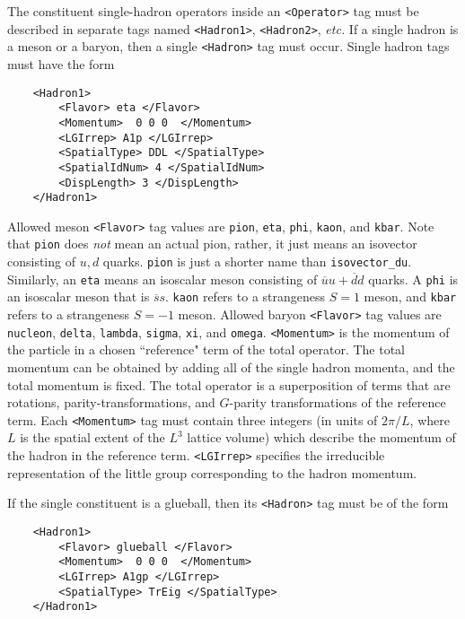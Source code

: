 \documentclass[12pt,notitlepage,letterpaper]{article}
\newcommand{\vb}{\texttt}
\begin{document}
The constituent single-hadron operators inside an \vb{<Operator>} tag
must be described in   
separate tags named \vb{<Hadron1>}, \vb{<Hadron2>}, \textit{etc.}  If a single hadron 
is a meson or a baryon, then a single \vb{<Hadron>} tag must occur.
Single hadron tags must have the form    
\begin{verbatim}                
    <Hadron1>                                               
        <Flavor> eta </Flavor>                               
        <Momentum>  0 0 0  </Momentum>                       
        <LGIrrep> A1p </LGIrrep>                             
        <SpatialType> DDL </SpatialType>                     
        <SpatialIdNum> 4 </SpatialIdNum>                     
        <DispLength> 3 </DispLength>                         
    </Hadron1>                                              
\end{verbatim}                                              
Allowed meson \vb{<Flavor>} tag values are \vb{pion}, \vb{eta}, \vb{phi},   
\vb{kaon}, and \vb{kbar}. Note that \vb{pion} does \textit{not} mean an actual  
pion, rather, it just means an isovector consisting of $u,d$    
quarks.  \vb{pion} is just a shorter name than \vb{isovector\_du}.   
Similarly, an \vb{eta} means an isoscalar meson consisting of    
$\overline{u}u+\overline{d}d$ quarks.  A \vb{phi} is an isoscalar meson 
that is $\overline{s}s$.    
\vb{kaon} refers to a strangeness $S=1$ meson, and \vb{kbar} refers   
to a strangeness $S=-1$ meson. Allowed baryon \vb{<Flavor>} tag      
values are \vb{nucleon}, \vb{delta}, \vb{lambda}, \vb{sigma}, \vb{xi}, and   
\vb{omega}.  \vb{<Momentum>} is the momentum of the particle          
in a chosen ``reference" term of the total operator.  The      
total momentum can be obtained by adding all of the single    
hadron momenta, and the total momentum is fixed.  The total   
operator is a superposition of terms that are rotations,      
parity-transformations, and $G$-parity transformations of the   
reference term. Each \vb{<Momentum>} tag must contain three        
integers (in units of $2\pi/L$, where $L$ is the spatial extent of the
$L^3$ lattice volume) which describe the momentum     
of the hadron in the reference term. \vb{<LGIrrep>} specifies the  
irreducible representation of the little group corresponding  
to the hadron momentum.                                       
                                                              
If the single constituent is a glueball, then its \vb{<Hadron>}    
tag must be of the form                                       
\begin{verbatim}
    <Hadron1>                                               
        <Flavor> glueball </Flavor>                          
        <Momentum>  0 0 0  </Momentum>                       
        <LGIrrep> A1gp </LGIrrep>                            
        <SpatialType> TrEig </SpatialType>                   
    </Hadron1>                                              
\end{verbatim}
\end{document}
